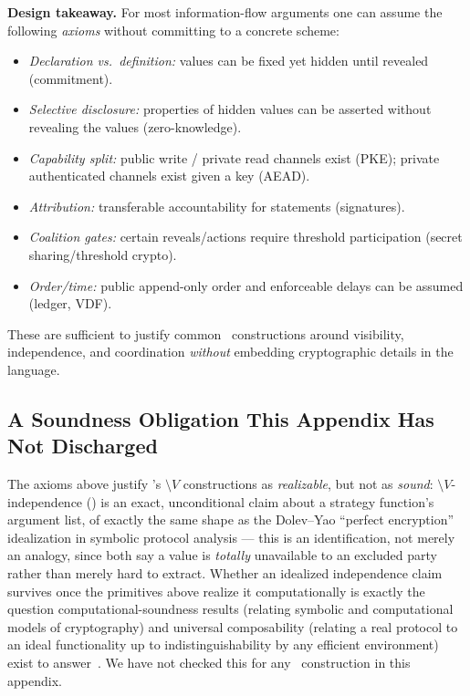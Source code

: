 \bigskip
\noindent\textbf{Design takeaway.}
For most information-flow arguments one can assume the following \emph{axioms}
without committing to a concrete scheme:
\begin{itemize}
  \item \emph{Declaration vs.\ definition:} values can be fixed yet hidden until revealed (commitment).
  \item \emph{Selective disclosure:} properties of hidden values can be asserted without revealing the values (zero-knowledge).
  \item \emph{Capability split:} public write / private read channels exist (PKE); private authenticated channels exist given a key (AEAD).
  \item \emph{Attribution:} transferable accountability for statements (signatures).
  \item \emph{Coalition gates:} certain reveals/actions require threshold participation (secret sharing/threshold crypto).
  \item \emph{Order/time:} public append-only order and enforceable delays can be assumed (ledger, VDF).
\end{itemize}
These are sufficient to justify common \KFOL\ constructions around visibility,
independence, and coordination \emph{without} embedding cryptographic details in
the language.

\subsection{A Soundness Obligation This Appendix Has Not Discharged}
\label{subsec:computational-soundness-gap}

The axioms above justify \KFOL's $\setminus V$ constructions as
\emph{realizable}, but not as \emph{sound}: $\setminus V$-independence
() is an exact, unconditional claim about a strategy
function's argument list, of exactly the same shape as the Dolev--Yao
``perfect encryption'' idealization in symbolic protocol analysis --- this is
an identification, not merely an analogy, since both say a value is
\emph{totally} unavailable to an excluded party rather than merely hard to
extract. Whether an idealized independence claim survives once the
primitives above realize it computationally is exactly the question
computational-soundness results (relating symbolic and computational models
of cryptography) and universal composability (relating a real protocol to an
ideal functionality up to indistinguishability by any efficient
environment) exist to
answer~\cite{AbadiRogaway2002Reconciling,Canetti2001UC}. We have not checked
this for any \KFOL\ construction in this appendix.

